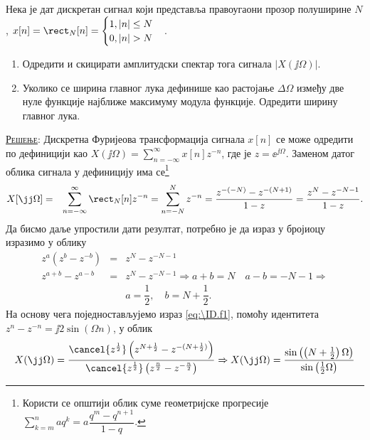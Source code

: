 \PID\mnImportant\label{z:dtft_rec}
Нека је дат дискретан сигнал који представља правоугаони прозор полуширине $N$,  
$x[n] = \rect_N[n] = \begin{cases}
    1, |n| \leq N \\
    0, |n| > N
\end{cases}$. 
\begin{enumerate}[label=(\alph*)]
    \item Одредити и скицирати амплитудски спектар тога сигнала $|X(\jj\Omega)|$.
    \item Уколико се ширина главног лука дефинише као растојање $\Delta \Omega$ између две нуле функције најближе 
    максимуму модула функције. Одредити ширину главног лука. 
\end{enumerate}

\textsc{\underline{Решење}:}
Дискретна Фуријеова трансформација сигнала $x[n]$ се може одредити по дефиницији као 
$X(\jj\Omega) = \sum_{n = -\infty}^{\infty} x[n] z^{-n}$, где је $z = \ee^{\jj\Omega}$. Заменом датог облика сигнала 
у дефиницију има се\footnote{Користи се општији облик суме геометријске прогресије
    $\sum_{k = m}^n a q^k = a\dfrac{q^m - q^{n+1}}{1-q}$.
}
\begin{eqnarray}
    X[\jj\Omega] &=& \sum_{n = -\infty}^{\infty} \rect_N[n] z^{-n} = \sum_{n = -N}^N z^{-n} 
    = \dfrac{ z^{-(-N)} - z^{-(N+1)} }{1 - z} = 
    \dfrac{z^{N} - z^{-N-1}}{1 - z}. \label{eq:\ID.f1}
\end{eqnarray}
Да бисмо даље упростили дати резултат, потребно је да израз у бројиоцу изразимо у облику
\begin{eqnarray}
    z^a(z^b - z^{-b}) &=& z^{N} - z^{-N-1}  \\[2mm]
    z^{a+b} - z^{a-b} &=& z^{N} - z^{-N-1} \Rightarrow
    a+b = N\quad a-b = -N-1  
    \Rightarrow \\
    && a = \dfrac{1}{2}, \quad b = N + \dfrac{1}{2}.
\end{eqnarray}
На основу чега поједностављујемо израз \ref{eq:\ID.f1}, помоћу идентитета 
$z^n - z^{-n} = \jj 2 \sin(\Omega n)$, у облик 
\begin{equation}
    X(\jj\Omega) = \dfrac{ \cancel{z^{\frac12}}\left( z^{N + \frac12} - z^{-(N + \frac12)} \right)  }
    { \cancel{z^{\frac12}} \left( z^{\frac n2} - z^{-\frac n2} \right)}
    \Rightarrow
    X(\jj\Omega) 
    = \dfrac{\sin \left( \left(N + \frac12\right) \Omega \right) }{ \sin \left(  \frac12 \Omega \right)}
    \label{\ID:eq_rez}
\end{equation}

